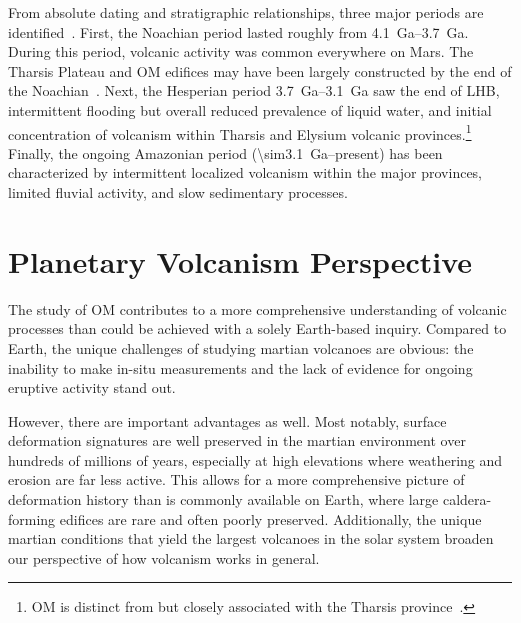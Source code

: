 From absolute dating and stratigraphic relationships, three major periods are identified~\parencite{carr_geologic_2010}. First, the Noachian period lasted roughly from \qtyrange{4.1}{3.7}{Ga}. During this period, volcanic activity was common everywhere on Mars. The Tharsis Plateau and \ac{OM} edifices may have been largely constructed by the end of the Noachian~\parencite{isherwood_volcanic_2013}. Next, the Hesperian period \qtyrange{3.7}{3.1}{Ga} saw the end of \ac{LHB}, intermittent flooding but overall reduced prevalence of liquid water, and initial concentration of volcanism within Tharsis and Elysium volcanic provinces.\footnote{\ac{OM} is distinct from but closely associated with the Tharsis province~\parencite{bleacher_trends_2007}.} Finally, the ongoing Amazonian period (\qty{\sim3.1}{Ga}--present) has been characterized by intermittent localized volcanism within the major provinces, limited fluvial activity, and slow sedimentary processes.

\section{Planetary Volcanism Perspective}
The study of \ac{OM} contributes to a more comprehensive understanding of volcanic processes than could be achieved with a solely Earth-based inquiry. Compared to Earth, the unique challenges of studying martian volcanoes are obvious: the inability to make in-situ measurements and the lack of evidence for ongoing eruptive activity stand out. 

However, there are important advantages as well. Most notably, surface deformation signatures are well preserved in the martian environment over hundreds of millions of years, especially at high elevations where weathering and erosion are far less active. This allows for a more comprehensive picture of deformation history than is commonly available on Earth, where large caldera-forming edifices are rare and often poorly preserved. Additionally, the unique martian conditions that yield the largest volcanoes in the solar system broaden our perspective of how volcanism works in general.

